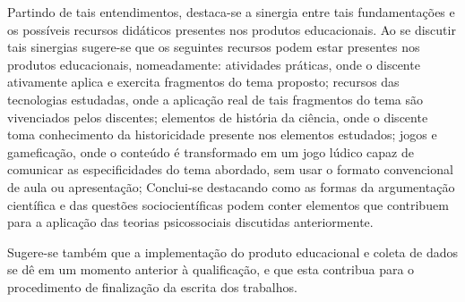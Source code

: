 \documentclass[
   article,       %
   12pt,          %
   oneside,       %
   a4paper,       %
   english,       %
   brazil,           %
   sumario=tradicional
   ]{abntex2}
\begin{document}
Partindo de tais entendimentos, destaca-se a sinergia entre tais fundamentações e os possíveis recursos didáticos presentes nos produtos educacionais. Ao se discutir tais sinergias sugere-se que os seguintes recursos podem estar presentes nos produtos educacionais, nomeadamente: atividades práticas, onde o discente ativamente aplica e exercita fragmentos do tema proposto; recursos das tecnologias estudadas, onde a aplicação real de tais fragmentos do tema são vivenciados pelos discentes; elementos de história da ciência, onde o discente toma conhecimento da historicidade presente nos elementos estudados; jogos e gameficação, onde o conteúdo é transformado em um jogo lúdico capaz de comunicar as especificidades do tema abordado, sem usar o formato convencional de aula ou apresentação; Conclui-se destacando como as formas da argumentação científica e das questões sociocientíficas podem conter elementos que contribuem para a aplicação das teorias psicossociais discutidas anteriormente.

Sugere-se também que a implementação do produto educacional e coleta de dados se dê em um momento anterior à qualificação, e que esta contribua para o procedimento de finalização da escrita dos trabalhos.



\postextual


\end{document}
